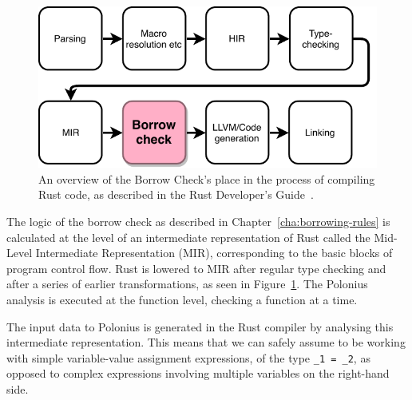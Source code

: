 \documentclass[11pt,a4paper,twoside,openany]{report}
\newcommand{\InRust}[1]{\texttt{#1}}
\renewcommand\_{\textunderscore\allowbreak}
\begin{document}
\begin{figure}[h!]
  \includegraphics[width=0.9\linewidth]{Graphs/rustc-overview}
  \caption[The Rust Compilation Process]{An overview of the Borrow Check's place
    in the process of compiling Rust code, as described in the Rust Developer's
    Guide~\cite{rustc_developers_guide_nodate}.}\label{fig:rustc-overview}
\end{figure}

The logic of the borrow check as described in Chapter~\ref{cha:borrowing-rules}
is calculated at the level of an intermediate representation of Rust called the
Mid-Level Intermediate Representation (MIR), corresponding to the basic blocks
of program control flow. Rust is lowered to MIR after regular type checking and
after a series of earlier transformations, as seen in
Figure~\ref{fig:rustc-overview}. The Polonius analysis is executed at the
function level, checking a function at a time.

The input data to Polonius is generated in the Rust compiler by analysing this
intermediate representation. This means that we can safely assume to be working
with simple variable-value assignment expressions, of the type \InRust{_1 = _2},
as opposed to complex expressions involving multiple variables on the right-hand
side.
\end{document}
